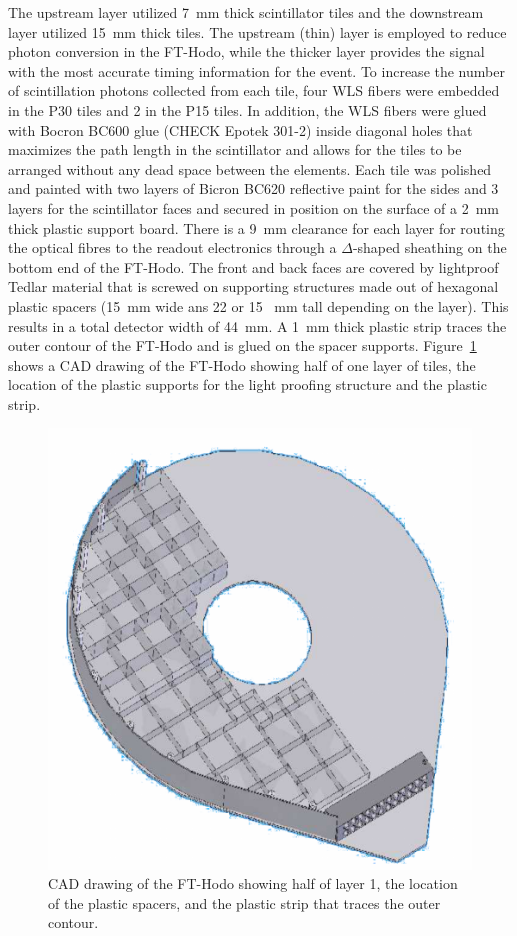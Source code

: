 The upstream layer utilized 7~mm thick scintillator tiles and the downstream layer utilized 15~mm thick tiles. The upstream (thin) layer is employed to reduce photon conversion in the FT-Hodo, while the thicker layer provides the signal with the most accurate timing information for the event. To increase the number of scintillation photons collected from each tile, four WLS fibers were embedded in the P30 tiles and 2 in the P15 tiles. In addition, the WLS fibers were glued with Bocron BC600 glue (CHECK Epotek 301-2) inside diagonal holes that maximizes the path length in the scintillator and allows for the tiles to be arranged without any dead space between the elements. Each tile was polished and painted with two layers of Bicron BC620 reflective paint for the sides and 3 layers for the scintillator faces and secured in position on the surface of a 2~mm thick plastic support board. There is a 9~mm clearance for each layer for routing the optical fibres to the readout electronics through a $\Delta$-shaped sheathing on the bottom end of the FT-Hodo. The front and back faces are covered by lightproof Tedlar material that is screwed on supporting structures made out of hexagonal plastic spacers (15~mm wide ans 22 or 15 ~mm tall depending on the layer). This results in a total detector width of 44~mm. A 1~mm thick plastic strip traces the outer contour of the FT-Hodo and is glued on the spacer supports. Figure~\ref{Fig:CADFT-Hodo} shows a CAD drawing of the FT-Hodo showing half of one layer of tiles, the location of the plastic supports for the light proofing structure and the plastic strip.  
\begin{figure}[th!]
\centering 
\includegraphics[width=0.85\columnwidth]{./fig/CADFT-Hodo.pdf} 
\caption{CAD drawing of the FT-Hodo showing half of layer 1, the location of the plastic spacers, and the plastic strip that traces the outer contour. } 
\label{Fig:CADFT-Hodo} 
\end{figure}

